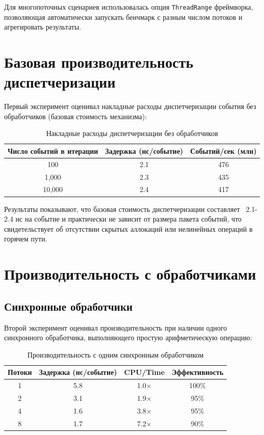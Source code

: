 \documentclass[12pt,a4paper]{report}
\begin{document}
Для многопоточных сценариев использовалась опция \texttt{ThreadRange} фреймворка, позволяющая автоматически запускать бенчмарк с разным числом потоков и агрегировать результаты.

\section{Базовая производительность диспетчеризации}
Первый эксперимент оценивал накладные расходы диспетчеризации события без обработчиков (базовая стоимость механизма):

\begin{table}[H]
\centering
\caption{Накладные расходы диспетчеризации без обработчиков}
\label{tab:baseline_dispatch}
\begin{tabular}{ccc}
\toprule
\textbf{Число событий в итерации} & \textbf{Задержка (нс/событие)} & \textbf{Событий/сек (млн)} \\
\midrule
100 & 2.1 & 476 \\
1,000 & 2.3 & 435 \\
10,000 & 2.4 & 417 \\
\bottomrule
\end{tabular}
\end{table}

Результаты показывают, что базовая стоимость диспетчеризации составляет ~2.1-2.4 нс на событие и практически не зависит от размера пакета событий, что свидетельствует об отсутствии скрытых аллокаций или нелинейных операций в горячем пути.

\section{Производительность с обработчиками}
\subsection{Синхронные обработчики}
Второй эксперимент оценивал производительность при наличии одного синхронного обработчика, выполняющего простую арифметическую операцию:

\begin{table}[H]
\centering
\caption{Производительность с одним синхронным обработчиком}
\label{tab:single_sync_handler}
\begin{tabular}{cccc}
\toprule
\textbf{Потоки} & \textbf{Задержка (нс/событие)} & \textbf{CPU/Time} & \textbf{Эффективность} \\
\midrule
1 & 5.8 & 1.0× & 100\% \\
2 & 3.1 & 1.9× & 95\% \\
4 & 1.6 & 3.8× & 95\% \\
8 & 1.7 & 7.2× & 90\% \\
\bottomrule
\end{tabular}
\end{table}
\end{document}
